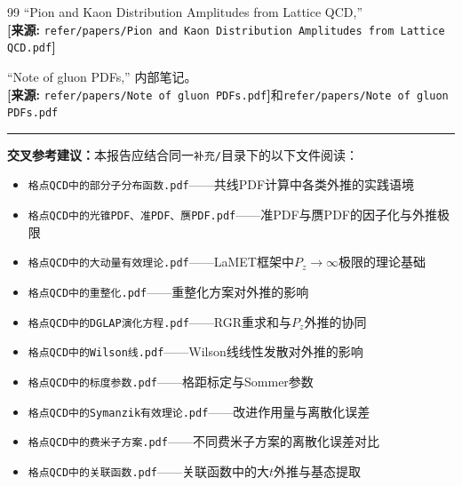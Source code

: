\documentclass[12pt,a4paper]{ctexart}
\theoremstyle{definition}
\begin{document}
\begin{thebibliography}{99}
``Pion and Kaon Distribution Amplitudes from Lattice QCD,''
\\\textbf{[来源:} \texttt{refer/papers/Pion and Kaon Distribution Amplitudes from Lattice QCD.pdf}\textbf{]}

``Note of gluon PDFs,'' 内部笔记。
\\\textbf{[来源:} \texttt{refer/papers/Note of gluon PDFs.pdf}\textbf{]}和\texttt{refer/papers/Note of gluon PDFs.pdf}

\end{thebibliography}

\vspace{0.5cm}
\noindent\rule{\textwidth}{0.5pt}
\small
\textbf{交叉参考建议：}本报告应结合同一\texttt{补充/}目录下的以下文件阅读：
\begin{itemize}[nosep]
    \item \texttt{格点QCD中的部分子分布函数.pdf}——共线PDF计算中各类外推的实践语境
    \item \texttt{格点QCD中的光锥PDF、准PDF、赝PDF.pdf}——准PDF与赝PDF的因子化与外推极限
    \item \texttt{格点QCD中的大动量有效理论.pdf}——LaMET框架中$P_z\to\infty$极限的理论基础
    \item \texttt{格点QCD中的重整化.pdf}——重整化方案对外推的影响
    \item \texttt{格点QCD中的DGLAP演化方程.pdf}——RGR重求和与$P_z$外推的协同
    \item \texttt{格点QCD中的Wilson线.pdf}——Wilson线线性发散对外推的影响
    \item \texttt{格点QCD中的标度参数.pdf}——格距标定与Sommer参数
    \item \texttt{格点QCD中的Symanzik有效理论.pdf}——改进作用量与离散化误差
    \item \texttt{格点QCD中的费米子方案.pdf}——不同费米子方案的离散化误差对比
    \item \texttt{格点QCD中的关联函数.pdf}——关联函数中的大$t$外推与基态提取
\end{itemize}
\end{document}
